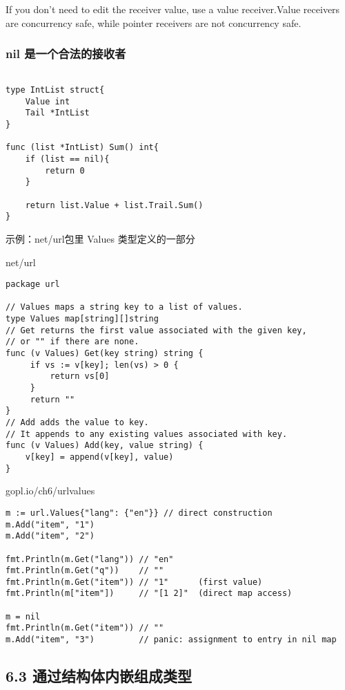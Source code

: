 If you don't need to edit the receiver value, use a value receiver.Value
receivers are concurrency safe, while pointer receivers are not
concurrency safe.

\hypertarget{nil-ux662fux4e00ux4e2aux5408ux6cd5ux7684ux63a5ux6536ux8005}{%
\subsubsection{nil
是一个合法的接收者}\label{nil-ux662fux4e00ux4e2aux5408ux6cd5ux7684ux63a5ux6536ux8005}}

\begin{verbatim}

type IntList struct{
    Value int
    Tail *IntList
}

func (list *IntList) Sum() int{
    if (list == nil){
        return 0
    }

    return list.Value + list.Trail.Sum()
}
\end{verbatim}

示例：net/url包里 Values 类型定义的一部分

net/url

\begin{verbatim}
package url

// Values maps a string key to a list of values.
type Values map[string][]string
// Get returns the first value associated with the given key,
// or "" if there are none.
func (v Values) Get(key string) string {
     if vs := v[key]; len(vs) > 0 {
         return vs[0]
     }
     return ""
}
// Add adds the value to key.
// It appends to any existing values associated with key.
func (v Values) Add(key, value string) {
    v[key] = append(v[key], value)
}
\end{verbatim}

gopl.io/ch6/urlvalues

\begin{verbatim}
m := url.Values{"lang": {"en"}} // direct construction
m.Add("item", "1")
m.Add("item", "2")

fmt.Println(m.Get("lang")) // "en"
fmt.Println(m.Get("q"))    // ""
fmt.Println(m.Get("item")) // "1"      (first value)
fmt.Println(m["item"])     // "[1 2]"  (direct map access)

m = nil
fmt.Println(m.Get("item")) // ""
m.Add("item", "3")         // panic: assignment to entry in nil map
\end{verbatim}

\hypertarget{ux901aux8fc7ux7ed3ux6784ux4f53ux5185ux5d4cux7ec4ux6210ux7c7bux578b}{%
\subsection{6.3
通过结构体内嵌组成类型}\label{ux901aux8fc7ux7ed3ux6784ux4f53ux5185ux5d4cux7ec4ux6210ux7c7bux578b}}

